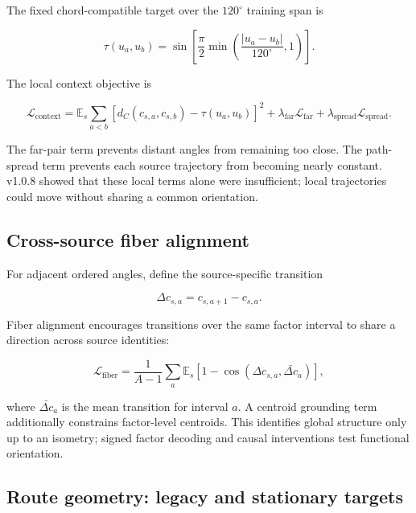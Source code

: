 \documentclass[11pt,a4paper]{article}
\newcommand{\E}{\mathbb{E}}
\newcommand{\loss}{\mathcal{L}}
\begin{document}
The fixed chord-compatible target over the $120^{\circ}$ training span is

\begin{equation}
 \tau(u_a,u_b)=
 \sin\left[\frac{\pi}{2}
 \min\left(\frac{|u_a-u_b|}{120^{\circ}},1\right)\right].
\end{equation}

The local context objective is

\begin{equation}
 \loss_{\mathrm{context}}
 =\E_s\sum_{a<b}
 \left[d_C(c_{s,a},c_{s,b})-\tau(u_a,u_b)\right]^2
 +\lambda_{\mathrm{far}}\loss_{\mathrm{far}}
 +\lambda_{\mathrm{spread}}\loss_{\mathrm{spread}}.
\end{equation}

The far-pair term prevents distant angles from remaining too close. The path-spread term prevents each source trajectory from becoming nearly constant. v1.0.8 showed that these local terms alone were insufficient; local trajectories could move without sharing a common orientation.

\subsection{Cross-source fiber alignment}

For adjacent ordered angles, define the source-specific transition

\begin{equation}
 \Delta c_{s,a}=c_{s,a+1}-c_{s,a}.
\end{equation}

Fiber alignment encourages transitions over the same factor interval to share a direction across source identities:

\begin{equation}
 \loss_{\mathrm{fiber}}=
 \frac{1}{A-1}\sum_a\E_s
 \left[1-\cos(\Delta c_{s,a},\bar{\Delta c}_a)\right],
\end{equation}

where $\bar{\Delta c}_a$ is the mean transition for interval $a$. A centroid grounding term additionally constrains factor-level centroids. This identifies global structure only up to an isometry; signed factor decoding and causal interventions test functional orientation.

\subsection{Route geometry: legacy and stationary targets}
\end{document}

